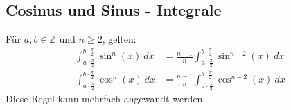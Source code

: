 \subsection{Cosinus und Sinus - Integrale}
    Für $a,b \in \mathbb{Z}$ und $n \geq 2$, gelten:
    \begin{align*}
        \int_{a \cdot \frac{\pi}{2}}^{b \cdot \frac{\pi}{2}} \sin^n(x) \ dx 
            &= \frac{n-1}{n} \int_{a \cdot \frac{\pi}{2}}^{b \cdot \frac{\pi}{2}} \sin^{n-2}(x) \ dx\\[0.5em]
        \int_{a \cdot \frac{\pi}{2}}^{b \cdot \frac{\pi}{2}} \cos^n(x) \ dx 
            &= \frac{n-1}{n} \int_{a \cdot \frac{\pi}{2}}^{b \cdot \frac{\pi}{2}} \cos^{n-2}(x) \ dx
    \end{align*}
    Diese Regel kann mehrfach angewandt werden.